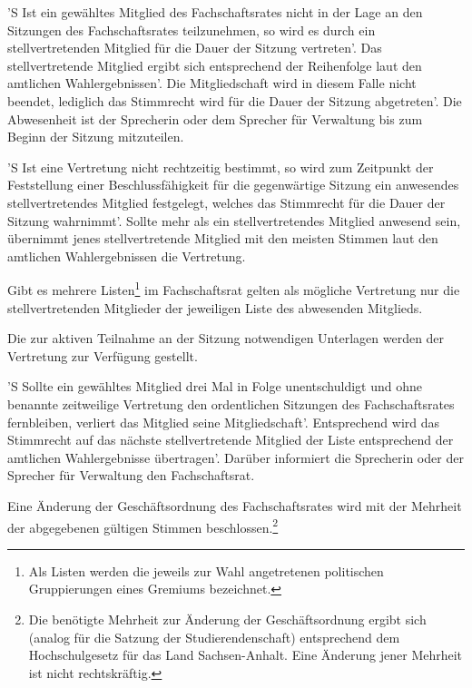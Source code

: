 \documentclass[%
	parskip=half,
]{scrartcl}
\begin{document}
\begin{contract}


'S Ist ein gewähltes Mitglied des Fachschaftsrates nicht in der Lage an den Sitzungen des Fachschaftsrates teilzunehmen,
so wird es durch ein stellvertretenden Mitglied für die Dauer der Sitzung vertreten'. Das stellvertretende Mitglied
ergibt sich entsprechend der Reihenfolge laut den amtlichen Wahlergebnissen'. Die Mitgliedschaft wird in diesem Falle
nicht beendet, lediglich das Stimmrecht wird für die Dauer der Sitzung abgetreten'. Die Abwesenheit ist der Sprecherin
oder dem Sprecher für Verwaltung bis zum Beginn der Sitzung mitzuteilen.

'S Ist eine Vertretung nicht rechtzeitig bestimmt, so wird zum Zeitpunkt der Feststellung einer Beschlussfähigkeit für
die gegenwärtige Sitzung ein anwesendes stellvertretendes Mitglied festgelegt, welches das Stimmrecht für die Dauer der
Sitzung wahrnimmt'. Sollte mehr als ein stellvertretendes Mitglied anwesend sein, übernimmt jenes stellvertretende
Mitglied mit den meisten Stimmen laut den amtlichen Wahlergebnissen die Vertretung.

Gibt es mehrere Listen\footnote{Als Listen werden die jeweils zur Wahl angetretenen politischen Gruppierungen eines
Gremiums bezeichnet.} im Fachschaftsrat gelten als mögliche Vertretung nur die stellvertretenden Mitglieder der
jeweiligen Liste des abwesenden Mitglieds.

Die zur aktiven Teilnahme an der Sitzung notwendigen Unterlagen werden der Vertretung zur Verfügung gestellt.

'S Sollte ein gewähltes Mitglied drei Mal in Folge unentschuldigt und ohne benannte zeitweilige Vertretung den
ordentlichen Sitzungen des Fachschaftsrates fernbleiben, verliert das Mitglied seine Mitgliedschaft'. Entsprechend wird
das Stimmrecht auf das nächste stellvertretende Mitglied der Liste entsprechend der amtlichen Wahlergebnisse
übertragen'. Darüber informiert die Sprecherin oder der Sprecher für Verwaltung den Fachschaftsrat.


Eine Änderung der Geschäftsordnung des Fachschaftsrates wird mit der Mehrheit der abgegebenen gültigen Stimmen
beschlossen.\footnote{Die benötigte Mehrheit zur Änderung der Geschäftsordnung ergibt sich (analog für die Satzung der
Studierendenschaft) entsprechend dem Hochschulgesetz für das Land Sachsen-Anhalt. Eine Änderung jener Mehrheit ist nicht
rechtskräftig.}


\end{contract}
\end{document}
